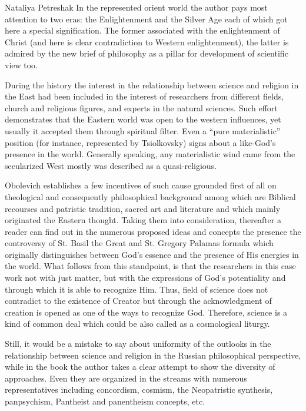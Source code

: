 \begin{recplenv}{Nataliya Petreshak}
In the represented orient world the author pays most attention to two eras: the Enlightenment and the Silver Age each of
which got here a special signification. The former associated with the enlightenment of Christ (and here is clear
contradiction to Western enlightenment), the latter is admired by the new brief of philosophy as a pillar for
development of scientific view too.


During the history the interest in the relationship between science and religion in the East had been included in the
interest of researchers from different fields, church and religious figures, and experts in the natural sciences. Such
effort demonstrates that the Eastern world was open to the western influences, yet usually it accepted them through
spiritual filter. Even a “pure materialistic” position (for instance, represented by Tsiolkovsky) signs about a
like-God’s presence in the world. Generally speaking, any materialistic wind came from the secularized West mostly was
described as a quasi-religious. 


Obolevich establishes a few incentives of such cause grounded first of all on theological and consequently
philosophical background among which are Biblical recourses and patristic tradition, sacred art and literature and
which mainly originated\textbf{ }the Eastern thought. Taking them into consideration, thereafter a reader can find out
in the numerous proposed ideas and concepts the presence the controversy of St. Basil the Great and St. Gregory Palamas
formula which originally distinguishes\textbf{ }between God’s essence and the presence of His energies in the world.
What follows from this standpoint, is that the researchers in this case work not with just matter, but with the
expressions of God’s potentiality and through which it is able to recognize Him. Thus, field of science does not
contradict to the existence of Creator but through the acknowledgment of creation is opened as one of the ways to
recognize God. Therefore, science is a kind of common deal which could be also called as a cosmological liturgy.


Still, it would be a mistake to say about uniformity of the outlooks in the relationship between science and religion in
the Russian philosophical perspective, while in the book the author takes a clear attempt to show the diversity of
approaches. Even they are organized in the streams with numerous representatives including concordism, cosmism, the
Neopatristic synthesis, panpsychism, Pantheist and panentheism concepts, etc.



\end{recplenv}
